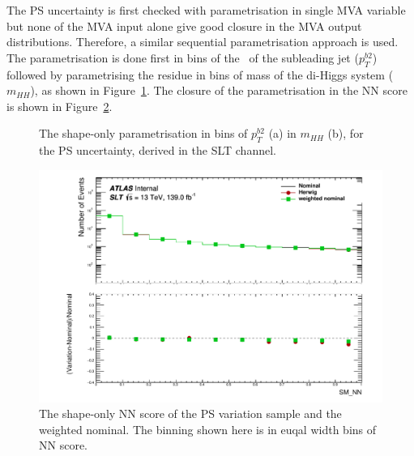 The PS uncertainty is first checked with 
parametrisation in single MVA variable
but none of the MVA input alone give good closure in the MVA output distributions. 
Therefore, a similar sequential parametrisation approach is used.
The parametrisation is done first 
in bins of the \pt\ of the subleading jet ($p_T^{b2}$) 
followed by parametrising the residue in bins
of mass of the di-Higgs system ($m_{HH}$), 
as shown in Figure~\ref{fig:ttbarsyst_lephad_herwig}.
The closure of the parametrisation in the NN score is shown in 
Figure~\ref{fig:ttbarsyst_lephad_herwig_NN}.
\begin{figure}
\caption{The shape-only parametrisation in bins of $p_T^{b2}$ (a)
in $m_{HH}$ (b), for the PS uncertainty, derived in the 
SLT channel.}
\label{fig:ttbarsyst_lephad_herwig}
\end{figure}

\begin{figure}
\centering
\includegraphics[width=.49\textwidth]{figures/lephad_modelling_systs/SLT/Herwig/Hist_and_ratio_SM_NN_Norm.pdf}
\caption{The shape-only NN score of the PS variation sample and the weighted nominal.
The binning shown here is in euqal width bins of NN score. }
\label{fig:ttbarsyst_lephad_herwig_NN}
\end{figure}


